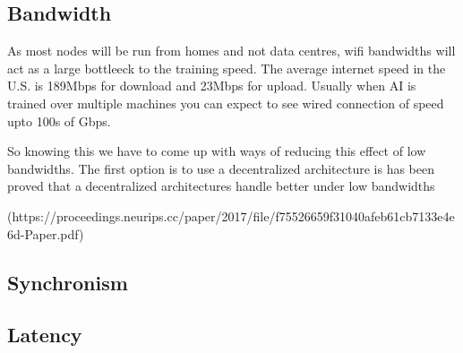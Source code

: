\documentclass[11pt]{article}
\begin{document}
\subsection{Bandwidth}
As most nodes will be run from homes and not data centres, wifi bandwidths will act as a large bottleeck to the training speed. The average internet speed in the U.S. is 189Mbps for download and 23Mbps for upload. Usually when AI is trained over multiple machines you can expect to see wired connection of speed upto 100s of Gbps.

So knowing this we have to come up with ways of reducing this effect of low bandwidths. The first option is to use a decentralized architecture is has been proved that a decentralized architectures handle better under low bandwidths

(https://proceedings.neurips.cc/paper/2017/file/f75526659f31040afeb61cb7133e4e6d-Paper.pdf)  

\subsection{Synchronism}

\subsection{Latency}




\end{document}

